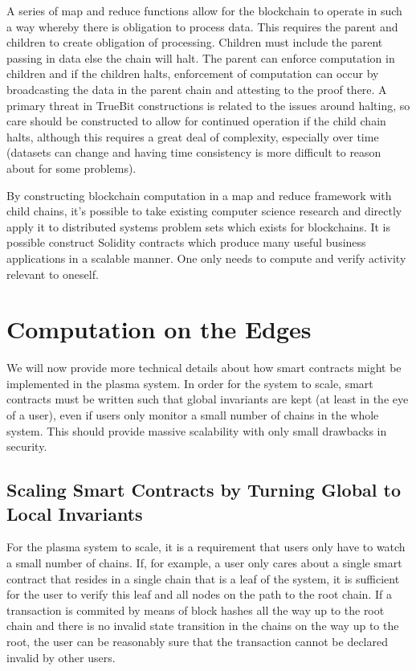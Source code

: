 \documentclass[letterpaper, 11pt]{article}
\begin{document}
A series of map and reduce functions allow for the blockchain to operate in such
a way whereby there is obligation to process data. This requires the parent and
children to create obligation of processing. Children must include the parent
passing in data else the chain will halt. The parent can enforce computation in
children and if the children halts, enforcement of computation can occur by
broadcasting the data in the parent chain and attesting to the proof there. A
primary threat in TrueBit constructions is related to the issues around halting,
so care should be constructed to allow for continued operation if the child
chain halts, although this requires a great deal of complexity, especially over
time (datasets can change and having time consistency is more difficult to
reason about for some problems).

By constructing blockchain computation in a map and reduce framework with child
chains, it's possible to take existing computer science research and directly
apply it to distributed systems problem sets which exists for blockchains. It is
possible construct Solidity contracts which produce many useful business
applications in a scalable manner. One only needs to compute and verify activity
relevant to oneself.

\section{Computation on the Edges}

We will now provide more technical details about how smart contracts
might be implemented in the plasma system. In order for the system to scale,
smart contracts must be written such that global invariants are kept
(at least in the eye of a user), even if users only monitor a small
number of chains in the whole system.
This should provide massive scalability with only small drawbacks in security.

\subsection{Scaling Smart Contracts by Turning Global to Local Invariants}

For the plasma system to scale, it is a requirement that users only
have to watch a small number of chains. If, for example, a user only cares about a single smart
contract that resides in a single chain that is a leaf of the system,
it is sufficient for the user to verify this leaf and all nodes on the 
path to the root chain. If a transaction is commited by means of block hashes
all the way up to the root chain and there is no invalid state transition in
the chains on the way up to the root, the user can be reasonably sure that
the transaction cannot be declared invalid by other users.
\end{document}
